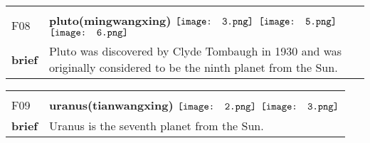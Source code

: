 \documentclass[UTF8]{article}
\begin{document}
            \begin{tabularx}{\textwidth}{p{1.5cm}X}
            \arrayrulecolor{myBlue}
        	\hline\\
            \small{F08}&
            \large{\bfseries{pluto(mingwangxing)}}\hfill
                                                            \phantom{$\vcenter{\hbox{\texttt{[image: 1.png]}}}$}
                                                                \phantom{$\vcenter{\hbox{\texttt{[image: 2.png]}}}$}
                                                                $\vcenter{\hbox{\texttt{[image: 3.png]}}}$
                                                                \phantom{$\vcenter{\hbox{\texttt{[image: 4.png]}}}$}
                                                                $\vcenter{\hbox{\texttt{[image: 5.png]}}}$
                                                                $\vcenter{\hbox{\texttt{[image: 6.png]}}}$
                                                                \phantom{$\vcenter{\hbox{\texttt{[image: 7.png]}}}$}
                                        \\[10pt]
            \large{\bfseries{brief}}&\noindent\parbox[c]{\hsize}{Pluto was discovered by Clyde Tombaugh in 1930 and was originally considered to be the ninth planet from the Sun.} \\[5pt]
            \hline\\[-10pt]
        \end{tabularx}
            \begin{tabularx}{\textwidth}{p{1.5cm}X}
            \arrayrulecolor{myBlue}
        	\hline\\
            \small{F09}&
            \large{\bfseries{uranus(tianwangxing)}}\hfill
                                                            \phantom{$\vcenter{\hbox{\texttt{[image: 1.png]}}}$}
                                                                $\vcenter{\hbox{\texttt{[image: 2.png]}}}$
                                                                $\vcenter{\hbox{\texttt{[image: 3.png]}}}$
                                                                \phantom{$\vcenter{\hbox{\texttt{[image: 4.png]}}}$}
                                                                \phantom{$\vcenter{\hbox{\texttt{[image: 5.png]}}}$}
                                                                \phantom{$\vcenter{\hbox{\texttt{[image: 6.png]}}}$}
                                                                \phantom{$\vcenter{\hbox{\texttt{[image: 7.png]}}}$}
                                        \\[10pt]
            \large{\bfseries{brief}}&\noindent\parbox[c]{\hsize}{Uranus is the seventh planet from the Sun.} \\[5pt]
            \hline\\[-10pt]
        \end{tabularx}
\end{document}

